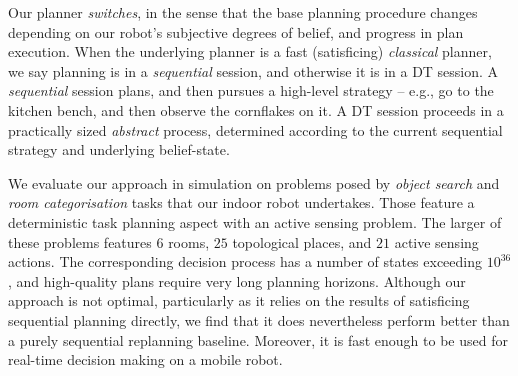 Our planner {\em switches}, in the sense that the base planning
procedure changes depending on our robot's subjective degrees of
belief, and progress in plan execution. When the underlying planner is
a fast (satisficing) {\em classical} planner, we say planning is in a
{\em sequential} session, and otherwise it is in a DT session.
A {\em sequential} session plans, and then pursues a high-level
strategy -- e.g., go to the kitchen bench, and then observe the
cornflakes on it.
A DT session proceeds in a practically sized {\em abstract} process,
determined according to the current sequential strategy and underlying
belief-state.


We evaluate our approach in simulation on problems posed by {\em
object search} and {\em room categorisation} tasks that our indoor
robot undertakes. Those feature a deterministic task planning aspect
with an active sensing problem. The larger of these problems features
$6$ rooms, $25$ topological places, and $21$ active sensing
actions. The corresponding decision process has a number of states
exceeding $10^{36}$, and high-quality plans require very long planning
horizons.
Although our approach is not optimal, particularly as it relies on the
results of satisficing sequential planning directly, we find that it
does nevertheless perform better than a purely sequential replanning
baseline. Moreover, it is fast enough to be used for real-time
decision making on a mobile robot.
